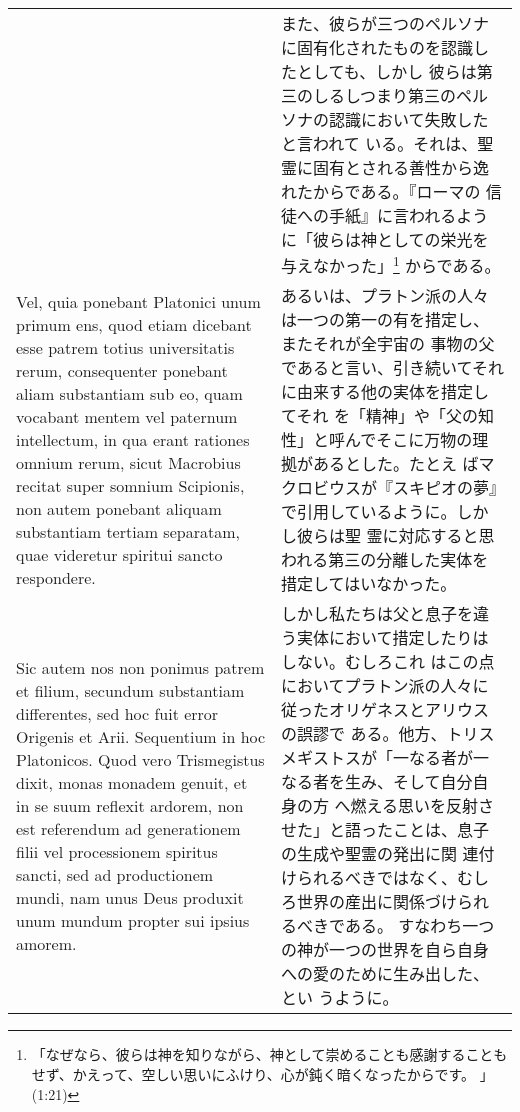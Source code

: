\documentclass[10pt]{jsarticle} %
\begin{document}
\begin{longtable}{p{21em}p{21em}}
&

また、彼らが三つのペルソナに固有化されたものを認識したとしても、しかし
彼らは第三のしるしつまり第三のペルソナの認識において失敗したと言われて
 いる。それは、聖霊に固有とされる善性から逸れたからである。『ローマの
 信徒への手紙』に言われるように「彼らは神としての栄光を与えなかった」\footnote{「なぜなら、彼らは神を知りながら、神として崇めることも感謝することもせず、かえって、空しい思いにふけり、心が鈍く暗くなったからです。 」(1:21)}
 からである。

\\


Vel, quia ponebant Platonici unum
primum ens, quod etiam dicebant esse patrem totius universitatis
rerum, consequenter ponebant aliam substantiam sub eo, quam vocabant
mentem vel paternum intellectum, in qua erant rationes omnium rerum,
sicut Macrobius recitat super somnium Scipionis, non autem ponebant
aliquam substantiam tertiam separatam, quae videretur spiritui sancto
respondere. 

&

あるいは、プラトン派の人々は一つの第一の有を措定し、またそれが全宇宙の
 事物の父であると言い、引き続いてそれに由来する他の実体を措定してそれ
 を「精神」や「父の知性」と呼んでそこに万物の理拠があるとした。たとえ
 ばマクロビウスが『スキピオの夢』で引用しているように。しかし彼らは聖
 霊に対応すると思われる第三の分離した実体を措定してはいなかった。

\\


Sic autem nos non ponimus patrem et filium, secundum
substantiam differentes, sed hoc fuit error Origenis et
Arii. Sequentium in hoc Platonicos. Quod vero Trismegistus dixit,
monas monadem genuit, et in se suum reflexit ardorem, non est
referendum ad generationem filii vel processionem spiritus sancti, sed
ad productionem mundi, nam unus Deus produxit unum mundum propter sui
ipsius amorem.


&

しかし私たちは父と息子を違う実体において措定したりはしない。むしろこれ
 はこの点においてプラトン派の人々に従ったオリゲネスとアリウスの誤謬で
 ある。他方、トリスメギストスが「一なる者が一なる者を生み、そして自分自身の方
 へ燃える思いを反射させた」と語ったことは、息子の生成や聖霊の発出に関
 連付けられるべきではなく、むしろ世界の産出に関係づけられるべきである。
 すなわち一つの神が一つの世界を自ら自身への愛のために生み出した、とい
 うように。


\\




\end{longtable}
\end{document}
